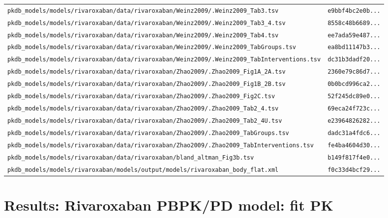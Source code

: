 \begin{longtable}{ll}
\texttt{pkdb\_models/models/rivaroxaban/data/rivaroxaban/Weinz2009/.Weinz2009\_Tab3.tsv} & \texttt{e9bbf4bc2e0b...} \\
\texttt{pkdb\_models/models/rivaroxaban/data/rivaroxaban/Weinz2009/.Weinz2009\_Tab3\_4.tsv} & \texttt{8558c48b6689...} \\
\texttt{pkdb\_models/models/rivaroxaban/data/rivaroxaban/Weinz2009/.Weinz2009\_Tab4.tsv} & \texttt{ee7ada59e487...} \\
\texttt{pkdb\_models/models/rivaroxaban/data/rivaroxaban/Weinz2009/.Weinz2009\_TabGroups.tsv} & \texttt{ea8bd11147b3...} \\
\texttt{pkdb\_models/models/rivaroxaban/data/rivaroxaban/Weinz2009/.Weinz2009\_TabInterventions.tsv} & \texttt{dc31b3dadf20...} \\
\texttt{pkdb\_models/models/rivaroxaban/data/rivaroxaban/Zhao2009/.Zhao2009\_Fig1A\_2A.tsv} & \texttt{2360e79c86d7...} \\
\texttt{pkdb\_models/models/rivaroxaban/data/rivaroxaban/Zhao2009/.Zhao2009\_Fig1B\_2B.tsv} & \texttt{0b0bcd996ca2...} \\
\texttt{pkdb\_models/models/rivaroxaban/data/rivaroxaban/Zhao2009/.Zhao2009\_Fig2C.tsv} & \texttt{52f245dc89e0...} \\
\texttt{pkdb\_models/models/rivaroxaban/data/rivaroxaban/Zhao2009/.Zhao2009\_Tab2\_4.tsv} & \texttt{69eca24f723c...} \\
\texttt{pkdb\_models/models/rivaroxaban/data/rivaroxaban/Zhao2009/.Zhao2009\_Tab2\_4U.tsv} & \texttt{e23964826282...} \\
\texttt{pkdb\_models/models/rivaroxaban/data/rivaroxaban/Zhao2009/.Zhao2009\_TabGroups.tsv} & \texttt{dadc31a4fdc6...} \\
\texttt{pkdb\_models/models/rivaroxaban/data/rivaroxaban/Zhao2009/.Zhao2009\_TabInterventions.tsv} & \texttt{fe4ba4604d30...} \\
\texttt{pkdb\_models/models/rivaroxaban/data/rivaroxaban/bland\_altman\_Fig3b.tsv} & \texttt{b149f817f4e0...} \\
\texttt{pkdb\_models/models/rivaroxaban/models/output/models/rivaroxaban\_body\_flat.xml} & \texttt{f0c33d4bcf29...} \\
\end{longtable}

\section{Results: Rivaroxaban PBPK/PD model: fit PK}

